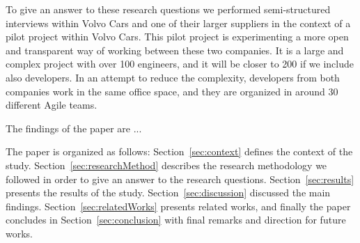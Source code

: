 To give an answer to these research questions we performed semi-structured interviews within Volvo Cars and 
one of their larger suppliers in the context of a pilot project within Volvo Cars. This pilot project is experimenting a more open and transparent way of working between these two companies. It is a large and complex project with over 100 engineers, and it will be closer to 200 if we include also developers. %
In an attempt to reduce the complexity, developers from both companies work in the same office space, and they are organized in around 30 different Agile teams. %

The findings of the paper are ...



The paper is organized as follows: Section~\ref{sec:context} defines the context of the study. Section~\ref{sec:researchMethod} describes the research methodology we followed in order to give an answer to the research questions. Section~\ref{sec:results} presents the results of the study. Section~\ref{sec:discussion} discussed the main findings. Section~\ref{sec:relatedWorks} presents related works, and finally the paper concludes in Section~\ref{sec:conclusion} with final remarks and direction for future works.